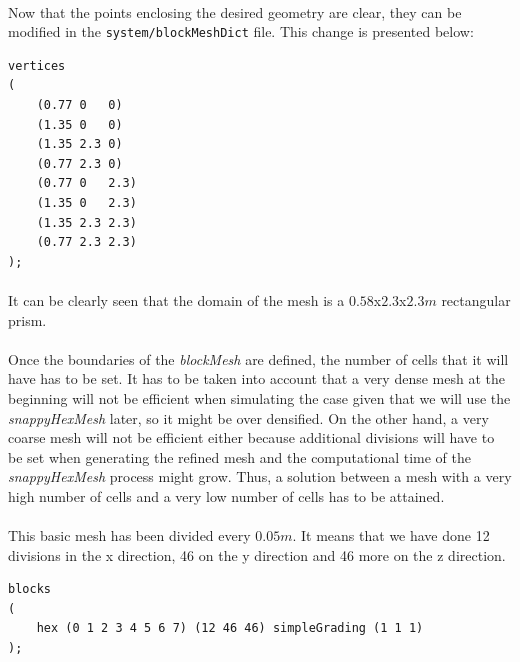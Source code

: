\paragraph{}Now that the points enclosing the desired geometry are clear, they can be modified in the \texttt{system/blockMeshDict} file. This change is presented below:

\begin{footnotesize}
\begin{verbatim}
vertices
(
    (0.77 0   0)
    (1.35 0   0)
    (1.35 2.3 0)
    (0.77 2.3 0)
    (0.77 0   2.3)
    (1.35 0   2.3)
    (1.35 2.3 2.3)
    (0.77 2.3 2.3)
);
\end{verbatim}
\end{footnotesize}

\paragraph{}It can be clearly seen that the domain of the mesh is a $0.58$x$2.3$x$2.3m$ rectangular prism.

\paragraph{}Once the boundaries of the \textit{blockMesh} are defined, the number of cells that it will have has to be set. It has to be taken into account that a very dense mesh at the beginning will not be efficient when simulating the case given that we will use the \textit{snappyHexMesh} later, so it might be over densified. On the other hand, a very coarse mesh will not be efficient either because additional divisions will have to be set when generating the refined mesh and the computational time of the \textit{snappyHexMesh} process might grow. Thus, a solution between a mesh with a very high number of cells and a very low number of cells has to be attained.

\paragraph{}This basic mesh has been divided every $0.05m$. It means that we have done 12 divisions in the x direction, 46 on the y direction and 46 more on the z direction. 

\begin{footnotesize}
\begin{verbatim}
blocks
(
    hex (0 1 2 3 4 5 6 7) (12 46 46) simpleGrading (1 1 1)
);
\end{verbatim}
\end{footnotesize}

